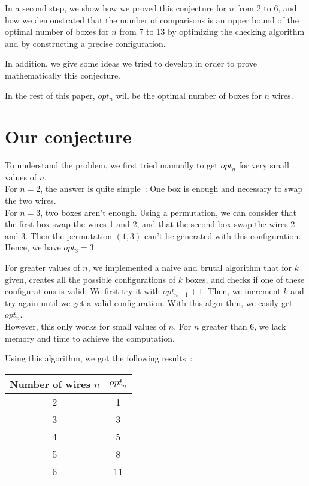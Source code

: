 \documentclass[11pt, a4paper]{article}
\begin{document}
In a second step, we show how we proved this conjecture for $n$ from 2 to 6, and how we demonstrated that the number of comparisons is an upper bound of the optimal number of boxes 
for $n$ from 7 to 13 by optimizing the checking algorithm and by constructing a precise configuration.

In addition, we give some ideas we tried to develop in order to prove mathematically this conjecture.

In the rest of this paper, $opt_n$ will be the optimal number of boxes for $n$ wires.



\section{Our conjecture}

To understand the problem, we first tried manually to get $opt_n$ for very small values of $n$.\\
For $n=2$, the answer is quite simple~: One box is enough and necessary to swap the two wires.\\
For $n=3$, two boxes aren't enough. Using a permutation, we can consider that the first box swap the wires 1 and 2, and that the second box swap the wires 2 and 3.
Then the permutation $(1,3)$ can't be generated with this configuration. Hence, we have $opt_3=3$.

For greater values of $n$, we implemented a naive and brutal algorithm that for $k$ given, creates all the possible configurations of $k$ boxes, 
and checks if one of these configurations is valid. We first try it with $opt_{n-1}+1$. Then,  we increment $k$ and try again until we get a valid configuration.
With this algorithm, we easily get $opt_n$.\\
However, this only works for small values of $n$. For $n$ greater than 6, we lack memory and time to achieve the computation.

Using this algorithm, we got the following results~:

\begin{tabular}{|c|c|}
\hline
Number of wires $n$ & $opt_n$ \\
\hline
2 & 1 \\
3 & 3 \\
4 & 5 \\
5 & 8 \\
6 & 11 \\
\hline
\end{tabular}\\
\end{document}
